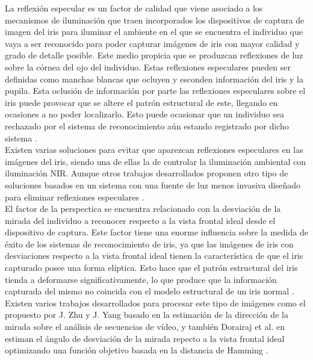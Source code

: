 La reflexión especular es un factor de calidad que viene asociado a los mecanismos de iluminación que traen incorporados los dispositivos de captura de imagen del iris para iluminar el ambiente en el que se encuentra el individuo que vaya a ser reconocido para poder capturar imágenes de iris con mayor calidad y grado de detalle posible. Este medio propicia que se produzcan reflexiones de luz sobre la córnea del ojo del individuo. Estas reflexiones especulares pueden ser definidas como manchas blancas que ocluyen y esconden información del iris y la pupila. Esta oclusión de información por parte las reflexiones especulares sobre el iris puede provocar que se altere el patrón estructural de este, llegando en ocasiones a no poder localizarlo. Esto puede ocasionar que un individuo sea rechazado por el sistema de reconocimiento aún estando registrado por dicho sistema \cite{Reference9}. \\

Existen varias soluciones para evitar que aparezcan reflexiones especulares en las imágenes del iris, siendo una de ellas la de controlar la iluminación ambiental con iluminación NIR. Aunque otros trabajos desarrollados proponen otro tipo de soluciones basados en un sistema con una fuente de luz menos invasiva diseñado para eliminar reflexiones especulares \cite{Reference12}. \\

El factor de la perspectica se encuentra relacionado con la desviación de la mirada del individuo a reconocer respecto a la vista frontal ideal desde el dispositivo de captura. Este factor tiene una enorme influencia sobre la medida de éxito de los sistemas de reconocimiento de iris, ya que las imágenes de iris con desviaciones respecto a la vista frontal ideal tienen la característica de que el iris capturado posee una forma elíptica. Esto hace que el patrón estructural del iris tienda a deformarse significativamente, lo que produce que la información capturada del mismo no coincida con el modelo estructural de un iris normal \cite{Reference9}. \\  

Existen varios trabajos desarrollados para procesar este tipo de imágenes como el propuesto por J. Zhu y J. Yang \cite{Reference13} basado en la estimación de la dirección de la mirada sobre el análisis de secuencias de vídeo, y también Dorairaj et al. en \cite{Reference14} estiman el ángulo de desviación de la mirada repecto a la vista frontal ideal optimizando una función objetivo basada en la distancia de Hamming \cite{Reference15}. \\

